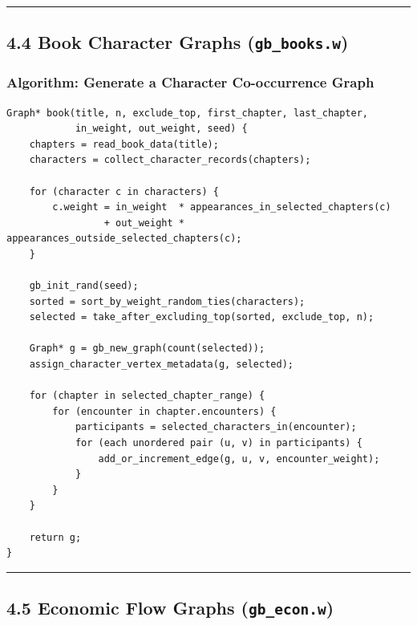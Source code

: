 \documentclass[11pt]{article}
\begin{document}
\begin{center}\rule{0.5\linewidth}{0.5pt}\end{center}

\subsection{\texorpdfstring{4.4 Book Character Graphs (\texttt{gb\_books.w})}{4.4 Book Character Graphs (gb\_books.w)}}\label{book-character-graphs-gb_books.w}

\subsubsection{Algorithm: Generate a Character Co-occurrence Graph}\label{algorithm-generate-a-character-co-occurrence-graph}

\begin{verbatim}
Graph* book(title, n, exclude_top, first_chapter, last_chapter,
            in_weight, out_weight, seed) {
    chapters = read_book_data(title);
    characters = collect_character_records(chapters);

    for (character c in characters) {
        c.weight = in_weight  * appearances_in_selected_chapters(c)
                 + out_weight * appearances_outside_selected_chapters(c);
    }

    gb_init_rand(seed);
    sorted = sort_by_weight_random_ties(characters);
    selected = take_after_excluding_top(sorted, exclude_top, n);

    Graph* g = gb_new_graph(count(selected));
    assign_character_vertex_metadata(g, selected);

    for (chapter in selected_chapter_range) {
        for (encounter in chapter.encounters) {
            participants = selected_characters_in(encounter);
            for (each unordered pair (u, v) in participants) {
                add_or_increment_edge(g, u, v, encounter_weight);
            }
        }
    }

    return g;
}
\end{verbatim}

\begin{center}\rule{0.5\linewidth}{0.5pt}\end{center}

\subsection{\texorpdfstring{4.5 Economic Flow Graphs (\texttt{gb\_econ.w})}{4.5 Economic Flow Graphs (gb\_econ.w)}}\label{economic-flow-graphs-gb_econ.w}
\end{document}
